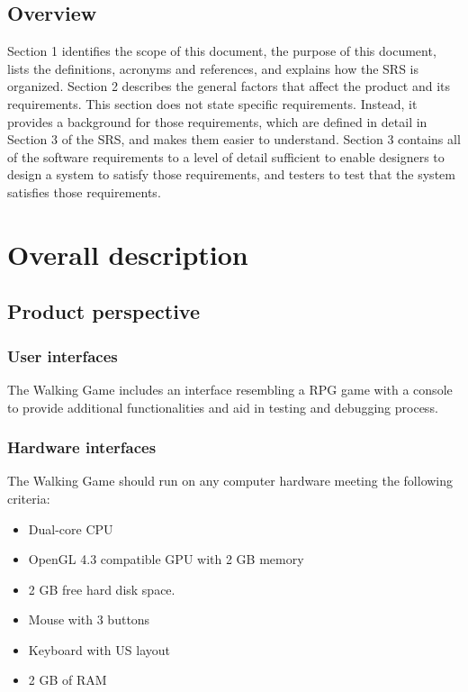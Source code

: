 \documentclass[12pt]{article}
\begin{document}
	\subsection{Overview}
	Section 1 identifies the scope of this document, the purpose of this document, lists the definitions, acronyms and references, and explains how the SRS is organized. Section 2 describes the general factors that affect the product and its requirements. This section does not state specific requirements. Instead, it provides a background for those requirements, which are defined in detail in Section 3 of the SRS, and makes them easier to understand. Section 3 contains all of the software requirements to a level of detail sufficient to enable designers to design a system to satisfy those requirements, and testers to test that the system satisfies those requirements.
	
	\clearpage
	\section{Overall description}
	
	\subsection{Product perspective}	
	
	\subsubsection{User interfaces}
	The Walking Game includes an interface resembling a RPG game with a console to provide additional functionalities and aid in testing and debugging process.
	
	\subsubsection{Hardware interfaces}
	The Walking Game should run on any computer hardware meeting the following criteria:
	\begin{itemize}
		\item Dual-core CPU
		\item OpenGL 4.3 compatible GPU with 2 GB memory
		\item 2 GB free hard disk space.
		\item Mouse with 3 buttons
		\item Keyboard with US layout
		\item 2 GB of RAM
	\end{itemize}
	
\end{document}
